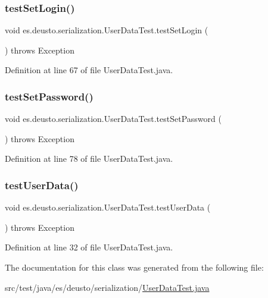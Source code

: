\subsubsection{\texorpdfstring{test\+Set\+Login()}{testSetLogin()}}
{\footnotesize\ttfamily void es.\+deusto.\+serialization.\+User\+Data\+Test.\+test\+Set\+Login (\begin{DoxyParamCaption}{ }\end{DoxyParamCaption}) throws Exception}



Definition at line 67 of file User\+Data\+Test.\+java.

\mbox{\label{classes_1_1deusto_1_1serialization_1_1_user_data_test_aad240f31ab64b02d0121e4e594185767}} 
\subsubsection{\texorpdfstring{test\+Set\+Password()}{testSetPassword()}}
{\footnotesize\ttfamily void es.\+deusto.\+serialization.\+User\+Data\+Test.\+test\+Set\+Password (\begin{DoxyParamCaption}{ }\end{DoxyParamCaption}) throws Exception}



Definition at line 78 of file User\+Data\+Test.\+java.

\mbox{\label{classes_1_1deusto_1_1serialization_1_1_user_data_test_ac1b9100261a66d06a4c8bf4f80e859ba}} 
\subsubsection{\texorpdfstring{test\+User\+Data()}{testUserData()}}
{\footnotesize\ttfamily void es.\+deusto.\+serialization.\+User\+Data\+Test.\+test\+User\+Data (\begin{DoxyParamCaption}{ }\end{DoxyParamCaption}) throws Exception}



Definition at line 32 of file User\+Data\+Test.\+java.



The documentation for this class was generated from the following file\+:\begin{DoxyCompactItemize}
\item 
src/test/java/es/deusto/serialization/\hyperlink{_user_data_test_8java}{User\+Data\+Test.\+java}\end{DoxyCompactItemize}
